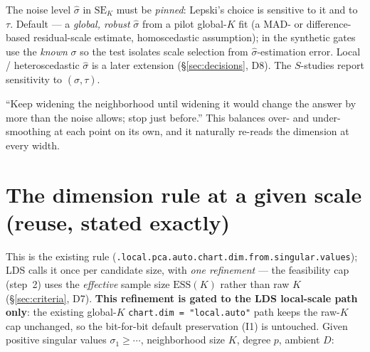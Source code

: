 \documentclass[11pt]{article}
\newcommand{\code}[1]{\texttt{#1}}
\begin{document}
\smallskip\noindent The noise level $\hat\sigma$ in $\mathrm{SE}_K$ must be \emph{pinned}:
Lepski's choice is sensitive to it and to $\tau$. Default --- a \emph{global, robust}
$\hat\sigma$ from a pilot global-$K$ fit (a MAD- or difference-based residual-scale
estimate, homoscedastic assumption); in the synthetic gates use the \emph{known} $\sigma$
so the test isolates scale selection from $\hat\sigma$-estimation error. Local /
heteroscedastic $\hat\sigma$ is a later extension (\S\ref{sec:decisions}, D8). The
$S$-studies report sensitivity to $(\hat\sigma,\tau)$.

\begin{plain}
``Keep widening the neighborhood until widening it would change the answer by more
than the noise allows; stop just before.'' This balances over- and under-smoothing at
each point on its own, and it naturally re-reads the dimension at every width.
\end{plain}

\section{The dimension rule at a given scale (reuse, stated exactly)}\label{sec:dimrule}

This is the existing rule (\code{.local.pca.auto.chart.dim.from.singular.values}); LDS
calls it once per candidate size, with \emph{one refinement} --- the feasibility cap
(step~2) uses the \emph{effective} sample size $\mathrm{ESS}(K)$ rather than raw $K$
(\S\ref{sec:criteria}, D7). \textbf{This refinement is gated to the LDS local-scale path
only}: the existing global-$K$ \code{chart.dim = "local.auto"} path keeps the raw-$K$ cap
unchanged, so the bit-for-bit default preservation (I1) is untouched. Given positive
singular values $\sigma_1\ge\cdots$, neighborhood size $K$, degree $p$, ambient $D$:
\end{document}
